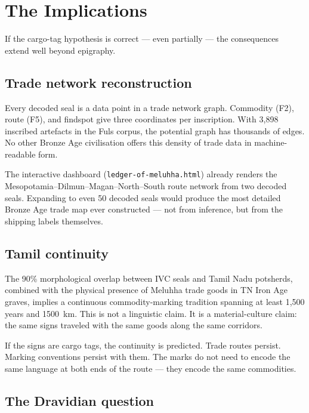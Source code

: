 \section{The Implications}

If the cargo-tag hypothesis is correct --- even partially --- the
consequences extend well beyond epigraphy.

\subsection{Trade network reconstruction}

Every decoded seal is a data point in a trade network graph.
Commodity (F2), route (F5), and findspot give three coordinates
per inscription. With 3{,}898 inscribed artefacts in the Fuls
corpus, the potential graph has thousands of edges. No other
Bronze Age civilisation offers this density of trade data in
machine-readable form.

The interactive dashboard (\texttt{ledger-of-meluhha.html})
already renders the Mesopotamia--Dilmun--Magan--North--South
route network from two decoded seals. Expanding to even 50
decoded seals would produce the most detailed Bronze Age trade
map ever constructed --- not from inference, but from the
shipping labels themselves.

\subsection{Tamil continuity}

The 90\% morphological overlap between IVC seals and Tamil Nadu
potsherds, combined with the physical presence of Meluhha trade
goods in TN Iron Age graves, implies a continuous
commodity-marking tradition spanning at least 1{,}500 years and
\SI{1500}{\kilo\metre}. This is not a linguistic claim. It is a
material-culture claim: the same signs traveled with the same
goods along the same corridors.

If the signs are cargo tags, the continuity is predicted. Trade
routes persist. Marking conventions persist with them. The marks
do not need to encode the same language at both ends of the
route --- they encode the same commodities.

\subsection{The Dravidian question}

